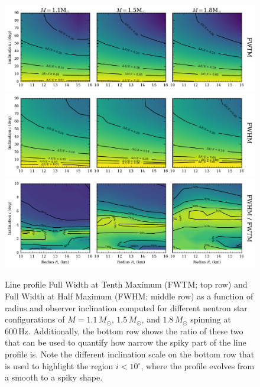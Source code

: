 \documentclass{aa}
\newcommand{\Msun}{\ensuremath{M_{\odot}}}
\renewcommand{\deg}{\ensuremath{^{\circ}}}
\begin{document}
\begin{figure}[htbp!]
\centering
    \includegraphics[width=18cm]{figs/fwhm_full.pdf}
    \includegraphics[width=18cm]{figs/fwhm_abs.pdf}
    \includegraphics[width=18cm]{figs/fwhm_rel.pdf}
\caption{\label{fig:fwhm}
    Line profile Full Width at Tenth Maximum (FWTM; top row) and Full Width at Half Maximum (FWHM; middle row) as a function of radius and observer inclination computed for different neutron star configurations of $M=1.1\,\Msun$, $1.5\,\Msun$, and $1.8\,\Msun$ spinning at $600\,\mathrm{Hz}$.
    Additionally, the bottom row shows the ratio of these two that can be used to quantify how narrow the spiky part of the line profile is.
    Note the different inclination scale on the bottom row that is used to highlight the region $i < 10\deg$, where the profile evolves from a smooth to a spiky shape.
}
\end{figure}
\end{document}
